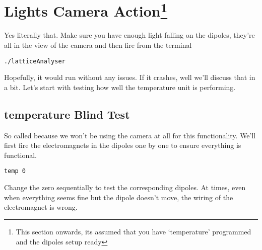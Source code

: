 \section{Lights Camera Action\protect\footnote{This section onwards, its assumed that you have `temperature' programmed and the dipoles setup ready}}
	Yes literally that. Make sure you have enough light falling on the dipoles, they're all in the view of the camera and then fire from the terminal
	\begin{lstlisting}
./latticeAnalyser
	\end{lstlisting}
	Hopefully, it would run without any issues. If it crashes, well we'll discuss that in a bit. Let's start with testing how well the temperature unit is performing.
	\subsection{temperature Blind Test}
		So called because we won't be using the camera at all for this functionality. We'll first fire the electromagnets in the dipoles one by one to ensure everything is functional.
		\begin{lstlisting}
temp 0
		\end{lstlisting}
		Change the zero sequentially to test the corresponding dipoles. At times, even when everything seems fine but the dipole doesn't move, the wiring of the electromagnet is wrong.
